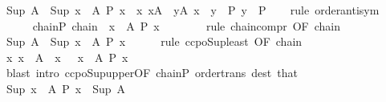 \begin{isabellebody}
\ {\isachardoublequoteopen}Sup\ A\ {\isacharequal}{\kern0pt}\ Sup\ {\isacharbraceleft}{\kern0pt}x\ {\isasymin}\ A{\isachardot}{\kern0pt}\ P\ x{\isacharbraceright}{\kern0pt}{\isachardoublequoteclose}\ \ {\isachardoublequoteopen}{\isasymAnd}x{\isachardot}{\kern0pt}\ x{\isasymin}A\ {\isasymLongrightarrow}\ {\isasymexists}y{\isasymin}A{\isachardot}{\kern0pt}\ x\ {\isasymle}\ y\ {\isasymand}\ P\ y{\isachardoublequoteclose}\ \ P\isanewline
\ \ \isamarkupfalse%
\ {\isacharparenleft}{\kern0pt}rule\ order{\isachardot}{\kern0pt}antisym{\isacharparenright}{\kern0pt}\isanewline
\ \ \ \ \isamarkupfalse%
\ chain{\isacharunderscore}{\kern0pt}P{\isacharcolon}{\kern0pt}\ {\isachardoublequoteopen}chain\ {\isacharparenleft}{\kern0pt}{\isasymle}{\isacharparenright}{\kern0pt}\ {\isacharbraceleft}{\kern0pt}x\ {\isasymin}\ A{\isachardot}{\kern0pt}\ P\ x{\isacharbraceright}{\kern0pt}{\isachardoublequoteclose}\isanewline
\ \ \ \ \ \ \isamarkupfalse%
\ {\isacharparenleft}{\kern0pt}rule\ chain{\isacharunderscore}{\kern0pt}compr\ {\isacharbrackleft}{\kern0pt}OF\ chain{\isacharbrackright}{\kern0pt}{\isacharparenright}{\kern0pt}\isanewline
\ \ \ \ \isamarkupfalse%
\ {\isachardoublequoteopen}Sup\ A\ {\isasymle}\ Sup\ {\isacharbraceleft}{\kern0pt}x\ {\isasymin}\ A{\isachardot}{\kern0pt}\ P\ x{\isacharbraceright}{\kern0pt}{\isachardoublequoteclose}\isanewline
\ \ \ \ \isamarkupfalse%
\ {\isacharparenleft}{\kern0pt}rule\ ccpo{\isacharunderscore}{\kern0pt}Sup{\isacharunderscore}{\kern0pt}least\ {\isacharbrackleft}{\kern0pt}OF\ chain{\isacharbrackright}{\kern0pt}{\isacharparenright}{\kern0pt}\isanewline
\ \ \ \ \ \ \isamarkupfalse%
\ {\isachardoublequoteopen}{\isasymAnd}x{\isachardot}{\kern0pt}\ x\ {\isasymin}\ A\ {\isasymLongrightarrow}\ x\ {\isasymle}\ {\isasymSqunion}\ {\isacharbraceleft}{\kern0pt}x\ {\isasymin}\ A{\isachardot}{\kern0pt}\ P\ x{\isacharbraceright}{\kern0pt}{\isachardoublequoteclose}\isanewline
\ \ \ \ \ \ \ \ \ \ \isamarkupfalse%
\ {\isacharparenleft}{\kern0pt}blast\ intro{\isacharcolon}{\kern0pt}\ ccpo{\isacharunderscore}{\kern0pt}Sup{\isacharunderscore}{\kern0pt}upper{\isacharbrackleft}{\kern0pt}OF\ chain{\isacharunderscore}{\kern0pt}P{\isacharbrackright}{\kern0pt}\ order{\isacharunderscore}{\kern0pt}trans\ dest{\isacharcolon}{\kern0pt}\ that{\isacharparenright}{\kern0pt}\isanewline
\ \ \ \ \ \ \isamarkupfalse%
\isanewline
\ \ \ \ \isamarkupfalse%
\ {\isachardoublequoteopen}Sup\ {\isacharbraceleft}{\kern0pt}x\ {\isasymin}\ A{\isachardot}{\kern0pt}\ P\ x{\isacharbraceright}{\kern0pt}\ {\isasymle}\ Sup\ A{\isachardoublequoteclose}\isanewline

\end{isabellebody}

